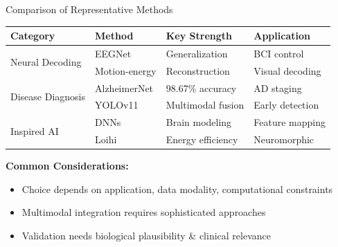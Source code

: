 \documentclass[aspectratio=169]{beamer}
\begin{document}
\begin{frame}{Comparison of Representative Methods}
  \small
  \begin{table}
    \centering
    \begin{tabular}{l l l l}
      \toprule
      \textbf{Category} & \textbf{Method} & \textbf{Key Strength} & \textbf{Application} \\
      \midrule
      \multirow{2}{*}{Neural Decoding} 
        & EEGNet & Generalization & BCI control \\
        & Motion-energy & Reconstruction & Visual decoding \\
      \midrule
      \multirow{2}{*}{Disease Diagnosis} 
        & AlzheimerNet & 98.67\% accuracy & AD staging \\
        & YOLOv11 & Multimodal fusion & Early detection \\
      \midrule
      \multirow{2}{*}{Inspired AI} 
        & DNNs & Brain modeling & Feature mapping \\
        & Loihi & Energy efficiency & Neuromorphic \\
      \bottomrule
    \end{tabular}
  \end{table}
  
  \vspace{0.5em}
  
  \textbf{Common Considerations:}
  \begin{itemize}
    \item Choice depends on application, data modality, computational constraints
    \item Multimodal integration requires sophisticated approaches
    \item Validation needs biological plausibility \& clinical relevance
  \end{itemize}
\end{frame}
\end{document}
